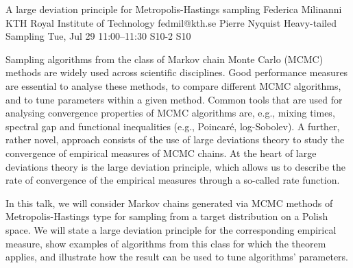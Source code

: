 \begin{talk}
  {A large deviation principle for Metropolis-Hastings sampling}%
  {Federica Milinanni}%
  {KTH Royal Institute of Technology}%
  {fedmil@kth.se}%
  {Pierre Nyquist}%
  {Heavy-tailed Sampling}%
  {Tue, Jul 29 11:00--11:30}%
  {S10-2}%
  {S10}%
    
   
   
Sampling algorithms from the class of Markov chain Monte Carlo (MCMC) methods are widely used across scientific disciplines. Good performance measures are essential to analyse these methods, to compare different MCMC algorithms, and to tune parameters within a given method. Common tools that are used for analysing convergence properties of MCMC algorithms are, e.g., mixing times, spectral gap and functional inequalities (e.g., Poincar\'e, log-Sobolev). A further, rather novel, approach consists of the use of large deviations theory to study the convergence of empirical measures of MCMC chains. At the heart of large deviations theory is the large deviation principle, which allows us to describe the rate of convergence of the empirical measures through a so-called rate function.

In this talk, we will consider Markov chains generated via MCMC methods of Metropolis-Hastings type for sampling from a target distribution on a Polish space. We will state a large deviation principle for the corresponding empirical measure, show examples of algorithms from this class for which the theorem applies, and illustrate how the result can be used to tune algorithms' parameters.

\medskip

\end{talk}

